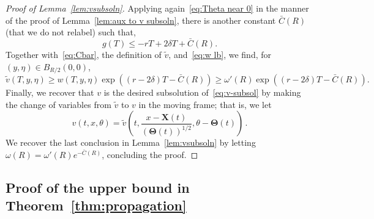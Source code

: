 \documentclass[10pt]{amsart}
\theoremstyle{definition}\newtheorem{defi}[theo]{Definition}\newtheorem{rema}[theo]{Remark}\newtheorem{exam}[theo]{Example}\newtheorem{exem}[theo]{Example}\newtheorem{nota}[theo]{Notation}
\newcommand{\bX}{\mathbf{X}}
\newcommand{\bTheta}{\boldsymbol{\Theta}}
\newcommand{\1}{\mathds{1}}
\begin{document}
\begin{proof}[Proof of Lemma~\ref{lem:vsubsoln}]
Applying again~\eqref{eq:Theta near 0} in the manner of the proof of Lemma~\ref{lem:aux to v subsoln}, there is another constant $\bar{C}(R)$ (that we do not relabel) such that,
\[
g(T) \leq -r T +2\delta T +\bar{C}(R).
\]
Together with~\eqref{eq:Cbar}, the definition of $\widetilde{v}$, and~\eqref{eq:w lb}, we find, for $(y,\eta)\in B_{R/2}(0,0)$,
\[
\widetilde{v}(T, y, \eta)\geq w(T, y, \eta) \exp\left ((r - 2\delta)T - \bar C(R) \right) \geq \omega'(R) \exp\left ((r - 2\delta)T - \bar C(R) \right).
\]
Finally, we recover that $v$ is the desired subsolution of~\eqref{eq:v-subsol} by making the change of variables from $\widetilde{v}$ to $v$ in the moving frame; that is, we let
\begin{equation*}
v(t,x,\theta) = \widetilde{v}\left (t, \dfrac{x - \bX(t)}{(\bTheta(t))^{1/2}}, \theta - \bTheta(t) \right)\,.
\end{equation*}
We recover the last conclusion in Lemma~\ref{lem:vsubsoln} by letting $\omega(R) = \omega'(R) e^{-\bar C(R)}$, concluding the proof.
\end{proof}



\subsection{Proof of the upper bound in Theorem~\ref{thm:propagation}}
\end{document}
